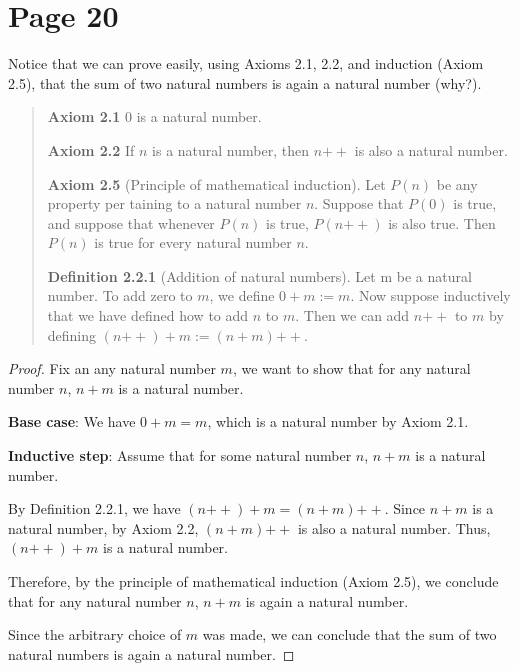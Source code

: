 \documentclass{article}
\newcommand{\doubleplus}{\mathbin{{+}{+}}}
\begin{document}
\section{Page 20}
Notice that we can prove easily, using Axioms 2.1, 2.2, and induction (Axiom
2.5), that the sum of two natural numbers is again a natural number (why?).

\begin{quotation}

    \textbf{Axiom 2.1} $0$ is a natural number.

    \textbf{Axiom 2.2} If $n$ is a natural number, then $n\doubleplus$ is also a natural number.

    \textbf{Axiom 2.5} (Principle of mathematical induction). Let $P(n)$ be any property per
    taining to a natural number $n$. Suppose that $P(0)$ is true, and suppose that whenever
    $P(n)$ is true, $P(n\doubleplus)$ is also true. Then $P(n)$ is true for every natural number $n$.

    \textbf{Definition 2.2.1} (Addition of natural numbers). Let m be a natural number. To add
    zero to $m$, we define $0 +m := m$.
    Now suppose inductively that we have defined how to add $n$ to $m$.
    Then we can add $n\doubleplus$ to $m$ by defining $(n\doubleplus)+m := (n +m)\doubleplus$.

\end{quotation}

\begin{proof}
    Fix an any natural number $m$,
    we want to show that for any natural number $n$, $n + m$ is a natural number.

    \textbf{Base case}:  We have $0 + m = m$, which is a natural number by Axiom 2.1.

    \textbf{Inductive step}: Assume that for some natural number $n$, $n + m$ is a natural number.

    By Definition 2.2.1, we have $(n\doubleplus) + m = (n + m) \doubleplus$.
    Since $n + m$ is a natural number, by Axiom 2.2, $(n + m) \doubleplus$ is also a natural number.
    Thus, $(n\doubleplus) + m$ is a natural number.

    Therefore, by the principle of mathematical induction (Axiom 2.5),
    we conclude that for any natural number $n$, $n+m$ is again a natural number.

    Since the arbitrary choice of $m$ was made,
    we can conclude that the sum of two natural numbers is again a natural number.

\end{proof}
\end{document}
